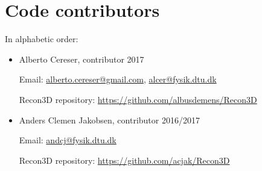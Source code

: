 \documentclass[11pt]{scrartcl}
\begin{document}
\section{Code contributors}

In alphabetic order:
\begin{itemize}
    \item Alberto Cereser, contributor 2017
    
    Email: \href{alberto.cereser@gmail.com}{alberto.cereser@gmail.com}, \href{alcer@fysik.dtu.dk}{alcer@fysik.dtu.dk}
    
    Recon3D repository: \href{https://github.com/albusdemens/Recon3D}{https://github.com/albusdemens/Recon3D}

    \item Anders Clemen Jakobsen, contributor 2016/2017
    
    Email: \href{andcj@fysik.dtu.dk}{andcj@fysik.dtu.dk}
    
    Recon3D repository: \href{https://github.com/acjak/Recon3D}{https://github.com/acjak/Recon3D}

\end{itemize}



\end{document}
